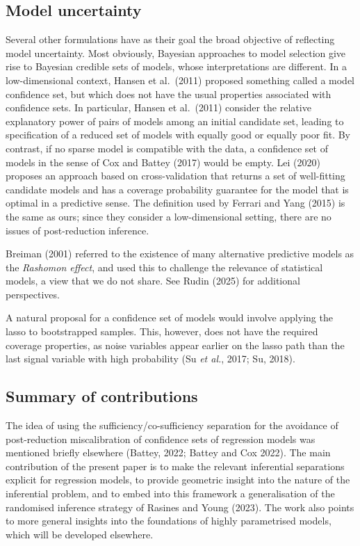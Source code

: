 \documentclass[10pt, reqno]{amsart}
\numberwithin{equation}{section}
\begin{document}
\subsection{Model uncertainty}\label{secModelUnc}

Several other formulations have as their goal the broad objective of reflecting model uncertainty. Most obviously, Bayesian approaches to model selection give rise to Bayesian credible sets of models, whose interpretations are different. In a low-dimensional context, Hansen et al.~(2011) proposed something called a model confidence set, but which does not have the usual properties associated with confidence sets. In particular, Hansen et al.~(2011) consider the relative explanatory power of pairs of models among an initial candidate set, leading to specification of a reduced set of models with equally good or equally poor fit. By contrast, if no sparse model is compatible with the data, a confidence set of models in the sense of Cox and Battey (2017) would be empty. Lei (2020) proposes an approach based on cross-validation that returns a set of well-fitting candidate models and has a coverage probability guarantee for the model that is optimal in a predictive sense. The definition used by Ferrari and Yang (2015) is the same as ours; since they consider a low-dimensional setting, there are no issues of post-reduction inference.  

Breiman (2001) referred to the existence of many alternative predictive models as the \emph{Rashomon effect}, and used this to challenge the relevance of statistical models, a view that we do not share. See Rudin (2025) for additional perspectives. 

A natural proposal for a confidence set of models would involve applying the lasso to bootstrapped samples. This, however, does not have the required coverage properties, as noise variables appear earlier on the lasso path than the last signal variable with high probability (Su \emph{et al.}, 2017; Su, 2018).


\subsection{Summary of contributions}\label{secContributions}

The idea of using the sufficiency/co-sufficiency separation for the avoidance of post-reduction miscalibration of confidence sets of regression models was mentioned briefly elsewhere (Battey, 2022; Battey and Cox 2022). The main contribution of the present paper is to make the relevant inferential separations explicit for regression models, to provide geometric insight into the nature of the inferential problem, and to embed into this framework a generalisation of the randomised inference strategy of Rasines and Young (2023). The work also points to more general insights into the foundations of highly parametrised models, which will be developed elsewhere.
\end{document}
